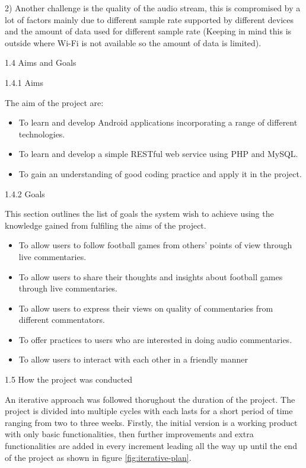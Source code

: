 \documentclass{article}
\begin{document}
\begin{flushleft}
2) Another challenge is the quality of the audio stream, this is compromised by a lot of factors mainly due to different sample rate supported by different devices and the amount of data used for different sample rate (Keeping in mind this is outside where Wi-Fi is not available so the amount of data is limited).\par
{\Large 1.4 Aims and Goals}\par
{\large 1.4.1 Aims}\par
The aim of the project are:
\vspace{-5mm}
\begin{itemize}
	\item [1.] To learn and develop Android applications incorporating a range of different technologies.
	\item [2.] To learn and develop a simple RESTful web service using PHP and MySQL.
	\item [3.] To gain an understanding of good coding practice and apply it in the project.
\end{itemize}
{\large 1.4.2 Goals}\par
This section outlines the list of goals the system wish to achieve using the knowledge gained from fulfiling the aims of the project.
\vspace{-5mm}
\begin{itemize}
	\item [1.] To allow users to follow football games from others’ points of view through live commentaries.
	\item [2.] To allow users to share their thoughts and insights about football games through live commentaries.
	\item [3.] To allow users to express their views on quality of commentaries from different commentators.
	\item [4.] To offer practices to users who are interested in doing audio commentaries.
	\item [5.] To allow users to interact with each other in a friendly manner
\end{itemize}
{\Large 1.5 How the project was conducted}\par
An iterative approach was followed thorughout the duration of the project. The project is divided into multiple cycles with each lasts for a short period of time ranging from two to three weeks. Firstly, the initial version is a working product with only basic functionalities, then further improvements and extra functionalities are added in every increment leading all the way up until the end of the project as shown in figure \ref{fig:iterative-plan}.\par

\end{flushleft}
\end{document}
